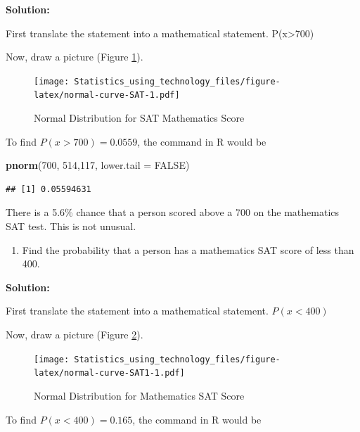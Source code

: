 \documentclass[]{book}
\newenvironment{Shaded}{\begin{snugshade}}{\end{snugshade}}
\newcommand{\DataTypeTok}[1]{\textcolor[rgb]{0.13,0.29,0.53}{#1}}
\newcommand{\DecValTok}[1]{\textcolor[rgb]{0.00,0.00,0.81}{#1}}
\newcommand{\KeywordTok}[1]{\textcolor[rgb]{0.13,0.29,0.53}{\textbf{#1}}}
\newcommand{\NormalTok}[1]{#1}
\newcommand{\OtherTok}[1]{\textcolor[rgb]{0.56,0.35,0.01}{#1}}
\providecommand{\tightlist}{%
  \setlength{\itemsep}{0pt}\setlength{\parskip}{0pt}}
\begin{document}
\textbf{Solution:}

First translate the statement into a mathematical statement. P(x\textgreater{}700)

Now, draw a picture (Figure \ref{fig:normal-curve-SAT}).



\begin{figure}
\centering
\texttt{[image: Statistics\_using\_technology\_files/figure-latex/normal-curve-SAT-1.pdf]}
\caption{\label{fig:normal-curve-SAT}Normal Distribution for SAT Mathematics Score}
\end{figure}

To find \(P(x>700)=0.0559\), the command in R would be

\begin{Shaded}
\begin{Highlighting}[]
\KeywordTok{pnorm}\NormalTok{(}\DecValTok{700}\NormalTok{, }\DecValTok{514}\NormalTok{,}\DecValTok{117}\NormalTok{, }\DataTypeTok{lower.tail =} \OtherTok{FALSE}\NormalTok{)}
\end{Highlighting}
\end{Shaded}

\begin{verbatim}
## [1] 0.05594631
\end{verbatim}

There is a 5.6\% chance that a person scored above a 700 on the mathematics SAT test. This is not unusual.

\begin{enumerate}
\def\labelenumi{\alph{enumi}.}
\setcounter{enumi}{2}
\tightlist
\item
  Find the probability that a person has a mathematics SAT score of less than 400.
\end{enumerate}

\textbf{Solution:}

First translate the statement into a mathematical statement. \(P(x<400)\)

Now, draw a picture (Figure \ref{fig:normal-curve-SAT1}).



\begin{figure}
\centering
\texttt{[image: Statistics\_using\_technology\_files/figure-latex/normal-curve-SAT1-1.pdf]}
\caption{\label{fig:normal-curve-SAT1}Normal Distribution for Mathematics SAT Score}
\end{figure}

To find \(P(x<400)=0.165\), the command in R would be
\end{document}

